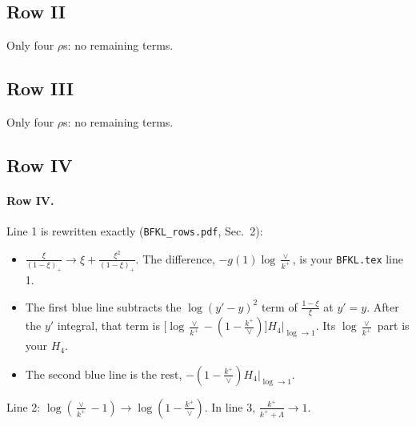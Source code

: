 \documentclass[10pt]{article}
\numberwithin{equation}{section}
\newcommand{\new}[1]{{\color{blue}#1}}
\begin{document}
\subsection{Row II}
Only four $\rho$\textquotesingle s: no remaining terms.
\subsection{Row III}
Only four $\rho$\textquotesingle s: no remaining terms.
\subsection{Row IV}
\paragraph{Row IV.}
Line 1 is rewritten exactly (\texttt{BFKL\_rows.pdf}, Sec.~2):
\begin{itemize}
\item $\frac{\xi}{(1-\xi)_+}\to\xi+\frac{\xi^2}{(1-\xi)_+}$. The difference, $-g(1)\log\frac{\vee}{k^+}$, is your \texttt{BFKL.tex} line 1.
\item The first \new{blue} line subtracts the $\log(y'-y)^2$ term of $\frac{1-\xi}{\xi}$ at $y'=y$. After the $y'$ integral, that term is $\big[\log\frac{\vee}{k^+}-(1-\frac{k^+}{\vee})\big]H_4\big|_{\log\to1}$. Its $\log\frac{\vee}{k^+}$ part is your $H_4$.
\item The second \new{blue} line is the rest, $-(1-\frac{k^+}{\vee})H_4\big|_{\log\to1}$.
\end{itemize}
Line 2: $\log(\frac{\vee}{k^+}-1)\to\log(1-\frac{k^+}{\vee})$. In line 3, $\frac{k^+}{k^++\Lambda}\to1$.
\end{document}
